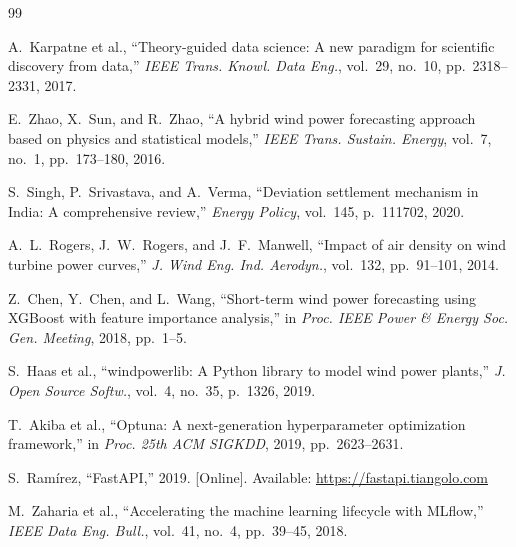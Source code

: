 \documentclass[12pt,a4paper]{report}
\begin{document}

\begin{thebibliography}{99}

A.~Karpatne et al.,
``Theory-guided data science: A new paradigm for scientific discovery from data,''
\textit{IEEE Trans. Knowl. Data Eng.}, vol.~29, no.~10, pp.~2318--2331, 2017.

E.~Zhao, X.~Sun, and R.~Zhao,
``A hybrid wind power forecasting approach based on physics and statistical models,''
\textit{IEEE Trans. Sustain. Energy}, vol.~7, no.~1, pp.~173--180, 2016.

S.~Singh, P.~Srivastava, and A.~Verma,
``Deviation settlement mechanism in India: A comprehensive review,''
\textit{Energy Policy}, vol.~145, p.~111702, 2020.

A.~L.~Rogers, J.~W.~Rogers, and J.~F.~Manwell,
``Impact of air density on wind turbine power curves,''
\textit{J. Wind Eng. Ind. Aerodyn.}, vol.~132, pp.~91--101, 2014.

Z.~Chen, Y.~Chen, and L.~Wang,
``Short-term wind power forecasting using XGBoost with feature importance analysis,''
in \textit{Proc. IEEE Power \& Energy Soc. Gen. Meeting}, 2018, pp.~1--5.

S.~Haas et al.,
``windpowerlib: A Python library to model wind power plants,''
\textit{J. Open Source Softw.}, vol.~4, no.~35, p.~1326, 2019.

T.~Akiba et al.,
``Optuna: A next-generation hyperparameter optimization framework,''
in \textit{Proc. 25th ACM SIGKDD}, 2019, pp.~2623--2631.

S.~Ram\'irez,
``FastAPI,'' 2019. [Online]. Available: \url{https://fastapi.tiangolo.com}

M.~Zaharia et al.,
``Accelerating the machine learning lifecycle with MLflow,''
\textit{IEEE Data Eng. Bull.}, vol.~41, no.~4, pp.~39--45, 2018.

\end{thebibliography}
\end{document}
